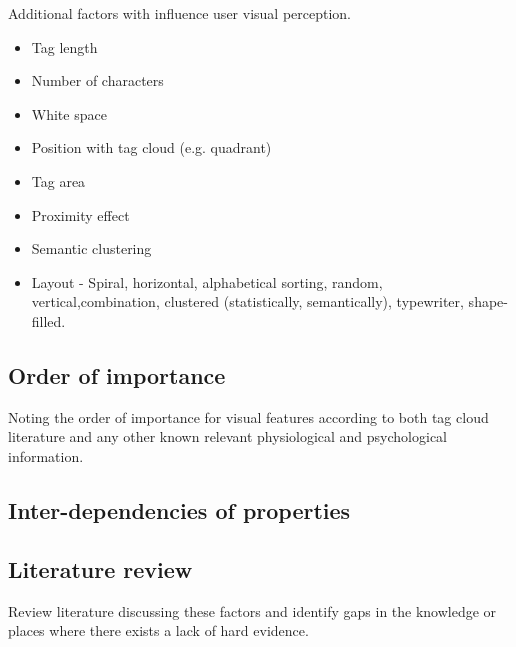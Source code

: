 
Additional factors with influence user visual perception.

\begin{itemize}
	\item Tag length
	\item Number of characters
	\item White space
	\item Position with tag cloud (e.g. quadrant)
	\item Tag area
	\item Proximity effect
	\item Semantic clustering
	\item Layout - Spiral, horizontal, alphabetical sorting, random, vertical,combination, clustered (statistically, semantically), typewriter, shape-filled.
\end{itemize}

\subsection{Order of importance}

Noting the order of importance for visual features according to both tag cloud literature and any other known relevant physiological and psychological information. 

\subsection{Inter-dependencies of properties}

\subsection{Literature review}

Review literature discussing these factors and identify gaps in the knowledge or places where there exists a lack of hard evidence.



